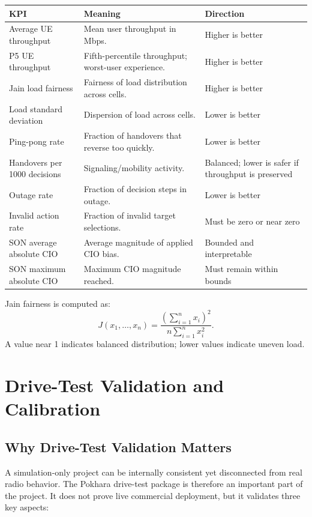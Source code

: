 \documentclass[12pt,a4paper]{report}
\begin{document}
\begin{longtable}{p{}p{}p{}}
\toprule
\textbf{KPI} & \textbf{Meaning} & \textbf{Direction}\\
\midrule
Average UE throughput & Mean user throughput in Mbps. & Higher is better\\
P5 UE throughput & Fifth-percentile throughput; worst-user experience. & Higher is better\\
Jain load fairness & Fairness of load distribution across cells. & Higher is better\\
Load standard deviation & Dispersion of load across cells. & Lower is better\\
Ping-pong rate & Fraction of handovers that reverse too quickly. & Lower is better\\
Handovers per 1000 decisions & Signaling/mobility activity. & Balanced; lower is safer if throughput is preserved\\
Outage rate & Fraction of decision steps in outage. & Lower is better\\
Invalid action rate & Fraction of invalid target selections. & Must be zero or near zero\\
SON average absolute CIO & Average magnitude of applied CIO bias. & Bounded and interpretable\\
SON maximum absolute CIO & Maximum CIO magnitude reached. & Must remain within bounds\\
\bottomrule
\end{longtable}

Jain fairness is computed as:
\begin{equation}
    J(x_1,\dots,x_n)=\frac{\left(\sum_{i=1}^{n}x_i\right)^2}{n\sum_{i=1}^{n}x_i^2}.
\end{equation}
A value near 1 indicates balanced distribution; lower values indicate uneven load.

\chapter{Drive-Test Validation and Calibration}

\section{Why Drive-Test Validation Matters}
A simulation-only project can be internally consistent yet disconnected from real radio behavior. The Pokhara drive-test package is therefore an important part of the project. It does not prove live commercial deployment, but it validates three key aspects:
\end{document}
